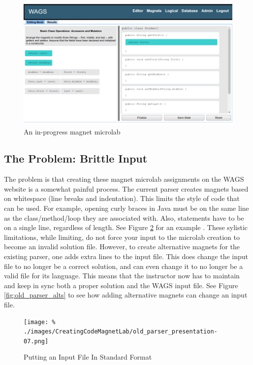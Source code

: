\documentclass[letter,10pt]{article}
\begin{document}
\begin{figure}
 \centering
 \includegraphics{./images/magnet-lab.png}
 \caption{An in-progress magnet microlab}
 \label{fig:magnet-lab}
\end{figure}

\subsection{The Problem: Brittle Input}

The problem is that creating these magnet microlab assignments on the 
WAGS website is a somewhat painful process. The current parser creates 
magnets based on whitespace (line breaks and indentation). This limits 
the style of code that can be used. For example, opening curly braces 
in Java must be on the same line as the class/method/loop they are 
associated with. Also, statements have to be on a single line, 
regardless of length. See Figure \ref{fig:old_parser_style} for an 
example \cite{icer_pres_4_creating_lab}. These sylistic limitations, 
while limiting, do not force your input to the microlab creation to 
become an invalid solution file. However, to create alternative magnets 
for the existing parser, one adds extra lines to the input file. This 
does change the input file to no longer be a correct solution, and can 
even change it to no longer be a valid file for its language. This 
means that the instructor now has to maintain and keep in sync both a 
proper solution and the WAGS input file. See Figure 
\ref{fig:old_parser_alts} to see how adding alternative magnets 
can change an input file\cite{icer_pres_4_creating_lab}.

\begin{figure}
 \centering
 
  \texttt{[image: \%    
./images/CreatingCodeMagnetLab/old\_parser\_presentation-07.png]}
 \caption{Putting an Input File In Standard Format}
 \label{fig:old_parser_style}
\end{figure}
\end{document}
